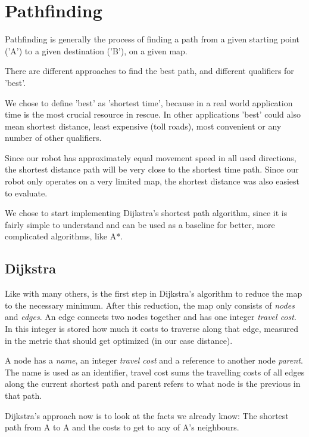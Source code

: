 \chapter{Pathfinding}\label{ch:path}
Pathfinding is generally the process of finding a path from a given starting point ('A')
to a given destination ('B'),
on a given map.

There are different approaches to find the best path,
and different qualifiers for 'best'.

We chose to define 'best' as 'shortest time',
because in a real world application time is the most crucial resource in rescue.
In other applications 'best' could also mean shortest distance, least expensive (toll roads),
most convenient or any number of other qualifiers.

Since our robot has approximately equal movement speed in all used directions,
the shortest distance path will be very close to the shortest time path.
Since our robot only operates on a very limited map,
the shortest distance was also easiest to evaluate.

We chose to start implementing Dijkstra's shortest path algorithm,
since it is fairly simple to understand
and can be used as a baseline for better, more complicated algorithms,
like A*.

\section{Dijkstra}
Like with many others,
is the first step in Dijkstra's algorithm to reduce the map to the necessary minimum.
After this reduction, the map only consists of \emph{nodes} and \emph{edges}.
An edge connects two nodes together and has one integer \emph{travel cost}.
In this integer is stored how much it costs to traverse along that edge,
measured in the metric that should get optimized (in our case distance).

A node has a \emph{name}, an integer \emph{travel cost} and a reference to another node \emph{parent}.
The name is used as an identifier,
travel cost sums the travelling costs of all edges along the current shortest path
and parent refers to what node is the previous in that path.

\cite{Pound2017}



Dijkstra's approach now is to look at the facts we already know:
The shortest path from A to A
and the costs to get to any of A's neighbours.

